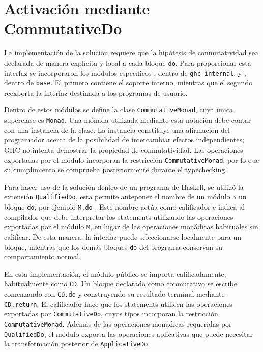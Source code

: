 
\section{Activación mediante CommutativeDo}
\label{sec:solucion-qualified-do}

La implementación de la solución requiere que la hipótesis de conmutatividad sea declarada de manera explícita y local a cada bloque \texttt{do}. Para proporcionar esta interfaz se incorporaron los módulos específicos , dentro de \texttt{ghc-internal}, y , dentro de \texttt{base}. El primero contiene el soporte interno, mientras que el segundo reexporta la interfaz destinada a los programas de usuario.

Dentro de estos módulos se define la clase \texttt{CommutativeMonad}, cuya única superclase es \texttt{Monad}. Una mónada utilizada mediante esta notación debe contar con una instancia de la clase. La instancia constituye una afirmación del programador acerca de la posibilidad de intercambiar efectos independientes; \textsf{GHC} no intenta demostrar la propiedad de conmutatividad. Las operaciones exportadas por el módulo incorporan la restricción \texttt{CommutativeMonad}, por lo que su cumplimiento se comprueba posteriormente durante el typechecking.

Para hacer uso de la solución dentro de un programa de \textsf{Haskell}, se utilizó la extensión \texttt{QualifiedDo}, esta permite anteponer el nombre de un módulo a un bloque \texttt{do}, por ejemplo \texttt{M.do} \cite{GHCQualifiedDo}. Este nombre actúa como calificador e indica al compilador que debe interpretar los statements utilizando las operaciones exportadas por el módulo \texttt{M}, en lugar de las operaciones monádicas habituales sin calificar. De esta manera, la interfaz puede seleccionarse localmente para un bloque, mientras que los demás bloques \texttt{do} del programa conservan su comportamiento normal.

En esta implementación, el módulo público se importa calificadamente, habitualmente como \texttt{CD}. Un bloque declarado como conmutativo se escribe comenzando con \texttt{CD.do} y construyendo su resultado terminal mediante \texttt{CD.return}. El calificador hace que los statements utilicen las operaciones exportadas por \texttt{CommutativeDo}, cuyos tipos incorporan la restricción \texttt{CommutativeMonad}. Además de las operaciones monádicas requeridas por \texttt{QualifiedDo}, el módulo exporta las operaciones aplicativas que puede necesitar la transformación posterior de \texttt{ApplicativeDo}.

